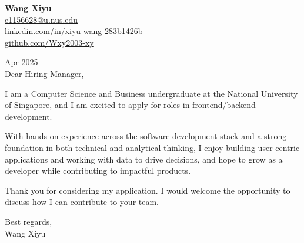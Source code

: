 \documentclass[12pt]{article}
\begin{document}
\noindent
\textbf{Wang Xiyu} \\
\href{mailto:e1156628@u.nus.edu}{e1156628@u.nus.edu} \\
\href{https://www.linkedin.com/in/xiyu-wang-283b1426b}{linkedin.com/in/xiyu-wang-283b1426b} \\
\href{https://github.com/Wxy2003-xy}{github.com/Wxy2003-xy} \\

\vspace{1em}

 Apr 2025 \\

\noindent
Dear Hiring Manager, \\

\vspace{0.5em}

I am a Computer Science and Business undergraduate at the National University of Singapore, and I am excited to apply for roles in frontend/backend development.


With hands-on experience across the software development stack and a strong foundation in both technical and analytical thinking, 
I enjoy building user-centric applications and working with data to drive decisions, and hope to grow as a developer while contributing to impactful products.

Thank you for considering my application. I would welcome the opportunity to discuss how I can contribute to your team.

\vspace{1em}

\noindent
Best regards, \\
Wang Xiyu
\end{document}
